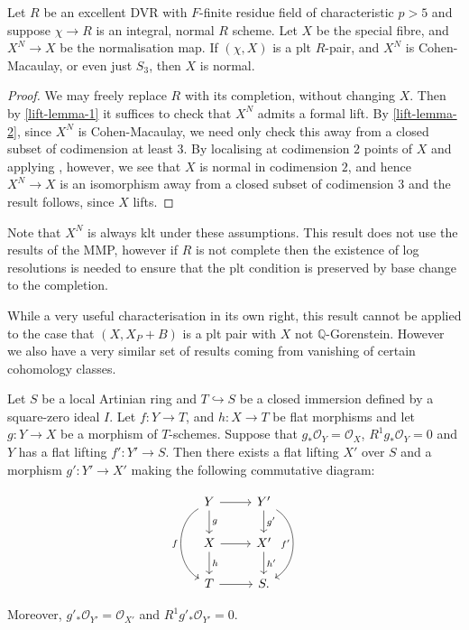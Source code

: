 \documentclass[a4paper,12pt]{book}
\newcommand{\ox}[1][X]{\mathcal{O}_{#1}}
\begin{document}
\begin{lemma}\label{adj1}
	
	Let $R$ be an excellent DVR with $F$-finite residue field of characteristic $p> 5$ and suppose $\chi \to R$ is an integral, normal $R$ scheme. Let $X$ be the special fibre, and $X^{N} \to X$ be the normalisation map. If $(\chi,X)$ is a plt $R$-pair, and $X^{N}$ is Cohen-Macaulay, or even just $S_{3}$, then $X$ is normal.
	
	\end{lemma}

\begin{proof}

	We may freely replace $R$ with its completion, without changing $X$. Then by \autoref{lift-lemma-1} it suffices to check that $X^{N}$ admits a formal lift. By \autoref{lift-lemma-2}, since $X^{N}$ is Cohen-Macaulay, we need only check this away from a closed subset of codimension at least $3$. By localising at codimension $2$ points of $X$ and applying \cite{}, however, we see that $X$ is normal in codimension $2$, and hence $X^{N} \to X$ is an isomorphism away from a closed subset of codimension $3$ and the result follows, since $X$ lifts.
	
\end{proof}

Note that $X^{N}$ is always klt under these assumptions. This result does not use the results of the MMP, however if $R$ is not complete then the existence of log resolutions is needed to ensure that the plt condition is preserved by base change to the completion.

While a very useful characterisation in its own right, this result cannot be applied to the case that $(X,X_{P}+B)$ is a plt pair with $X$ not $\mathbb{Q}$-Gorenstein. However we also have a very similar set of results coming from vanishing of certain cohomology classes. 

\begin{proposition}\label{push-lift}
	Let $S$ be a local Artinian ring and $T \hookrightarrow S$ be a closed immersion defined by a square-zero ideal $I$.  Let $f\colon Y \to T$, and $h\colon X \to T$ be flat morphisms and let $g\colon Y \to X$ be a morphism of $T$-schemes. 
	Suppose that $g_{*} \ox[Y]=\ox$, $R^{1}g_{*} \ox[Y] = 0$ and $Y$ has a flat lifting $f' \colon Y' \to S$. Then there exists a flat lifting $X'$ over $S$ and a morphism $g' \colon Y' \to X'$ making the following commutative diagram:
	
	\[\begin{tikzcd}
	Y \arrow[r] \arrow[d, "g"]  \arrow[bend right=60,swap, "f"]{dd}
	& Y' \arrow[d, "g'"] \arrow[bend left=60,swap, "f'"]{dd} \\
	X \arrow[d, "h"] \arrow[r] & X' \arrow[d, "h'"] \\
	T \arrow[r]                        & S    .                     
	\end{tikzcd}\]
	
	Moreover,  $g'_{*} \ox[Y']=\ox[X']$ and $R^{1}g'_{*} \ox[Y'] = 0$.
\end{proposition}
\end{document}
